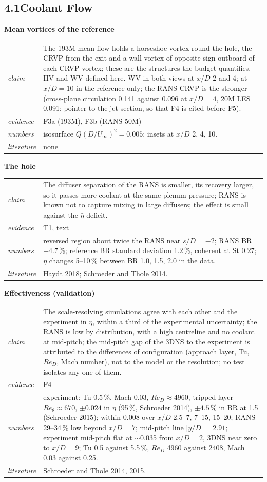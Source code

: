 \documentclass[10pt]{article}
\makeatletter
\newcommand{\etab}{\bar\eta}
\newcommand{\blk}[5]{\textbf{#1}\par
\begin{tabularx}{\textwidth}{@{}>{\itshape}l X@{}}
claim & #2\\ evidence & #3\\ numbers & #4\\ literature & #5\\
\end{tabularx}\par\smallskip}
\makeatother
\begin{document}
\subsection*{4.1\quad Coolant Flow}

\blk{Mean vortices of the reference}{The 193M mean flow holds a horseshoe vortex round the hole, the CRVP from the
exit and a wall vortex of opposite sign outboard of each CRVP vortex; these are the structures the budget
quantifies. HV and WV defined here. WV in both views at $x/D$ 2 and 4; at $x/D=10$ in the reference only; the
RANS CRVP is the stronger (cross-plane circulation 0.141 against 0.096 at $x/D=4$, 20M LES 0.091; pointer to
the jet section, so that F4 is cited before F5).}{F3a (193M), F3b (RANS 50M)}{isosurface $Q(D/U_\infty)^2=0.005$; insets at $x/D$ 2, 4, 10.}{none}

\blk{The hole}{The diffuser separation of the RANS is smaller, its recovery larger, so it passes more coolant at
the same plenum pressure; RANS is known not to capture mixing in large diffusers; the effect is small against
the $\etab$ deficit.}{T1, text}{reversed
region about twice the RANS near $s/D=-2$; RANS BR $+4.7$\,\%; reference BR standard deviation 1.2\,\%, coherent at
St 0.27; $\etab$ changes 5--10\,\% between BR 1.0, 1.5, 2.0 in the data.}{Haydt 2018; Schroeder and Thole
2014.}

\blk{Effectiveness (validation)}{The scale-resolving simulations agree with each other and the experiment in
$\etab$, within a third of the experimental uncertainty; the RANS is low by distribution, with a high centreline and
no coolant at mid-pitch; the mid-pitch gap of the 3DNS to the experiment is attributed to the differences of
configuration (approach layer, Tu, $Re_D$, Mach number), not to the model or the resolution; no test isolates any
one of them.}{F4}{experiment: Tu 0.5\,\%, Mach 0.03, $Re_D\approx4960$, tripped layer $Re_\theta\approx670$, $\pm0.024$ in
$\eta$ (95\,\%, Schroeder 2014), $\pm4.5$\,\% in BR at 1.5 (Schroeder 2015); within 0.008 over $x/D$ 2.5--7, 7--15,
15--20; RANS 29--34\,\% low beyond $x/D=7$; mid-pitch line $|y/D|=2.91$; experiment mid-pitch flat at
$\sim$0.035 from $x/D=2$, 3DNS near zero to $x/D=9$; Tu 0.5 against 5.5\,\%, $Re_D$ 4960 against 2408, Mach 0.03
against 0.25.}{Schroeder and Thole 2014, 2015.}
\end{document}
